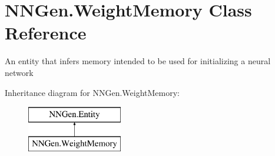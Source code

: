 \hypertarget{class_n_n_gen_1_1_weight_memory}{}\section{N\+N\+Gen.\+Weight\+Memory Class Reference}
\label{class_n_n_gen_1_1_weight_memory}


An entity that infers memory intended to be used for initializing a neural network  


Inheritance diagram for N\+N\+Gen.\+Weight\+Memory\+:\begin{figure}[H]
\begin{center}
\leavevmode
\includegraphics[height=2.000000cm]{class_n_n_gen_1_1_weight_memory}
\end{center}
\end{figure}
